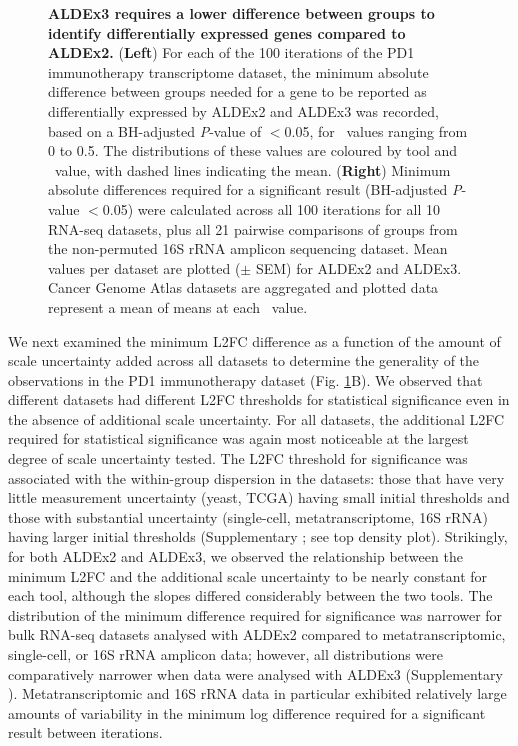 \documentclass[10pt,letterpaper]{article}
\begin{document}
\begin{figure}[H]
    \centering
    \caption{\textbf{ALDEx3 requires a lower difference between groups to identify differentially expressed genes compared to ALDEx2.} (\textbf{Left}) For each of the 100 iterations of the PD1 immunotherapy transcriptome dataset, the minimum absolute difference between groups needed for a gene to be reported as differentially expressed by ALDEx2 and ALDEx3 was recorded, based on a BH-adjusted \textit{P}-value of $<$0.05, for \textgamma~values ranging from 0 to 0.5. The distributions of these values are coloured by tool and \textgamma~value, with dashed lines indicating the mean. (\textbf{Right}) Minimum absolute differences required for a significant result (BH-adjusted \textit{P}-value $<$0.05) were calculated across all 100 iterations for all 10 RNA-seq datasets, plus all 21 pairwise comparisons of groups from the non-permuted 16S rRNA amplicon sequencing dataset. Mean values per dataset are plotted ($\pm$ SEM) for ALDEx2 and ALDEx3. Cancer Genome Atlas datasets are aggregated and plotted data represent a mean of means at each \textgamma~value.}
    \label{fig:density}
\end{figure}

We next examined the minimum L2FC difference as a function of the amount of scale uncertainty added across all datasets to determine the generality of the observations in the PD1 immunotherapy dataset (Fig. \ref{fig:density}B). We observed that different datasets had different L2FC thresholds for statistical significance even in the absence of additional scale uncertainty. For all datasets, the additional L2FC required for statistical significance was again most noticeable at the largest degree of scale uncertainty tested. The L2FC threshold for significance was associated with the within-group dispersion in the datasets: those that have very little measurement uncertainty (yeast, TCGA) having small initial thresholds and those with substantial uncertainty (single-cell, metatranscriptome, 16S rRNA) having larger initial thresholds (Supplementary ; see top density plot). Strikingly, for both ALDEx2 and ALDEx3, we observed the relationship between the minimum L2FC and the additional scale uncertainty to be nearly constant for each tool, although the slopes differed considerably between the two tools. The distribution of the minimum difference required for significance was narrower for bulk RNA-seq datasets analysed with ALDEx2 compared to metatranscriptomic, single-cell, or 16S rRNA amplicon data; however, all distributions were comparatively narrower when data were analysed with ALDEx3 (Supplementary ). Metatranscriptomic and 16S rRNA data in particular exhibited relatively large amounts of variability in the minimum log difference required for a significant result between iterations. 
\end{document}
